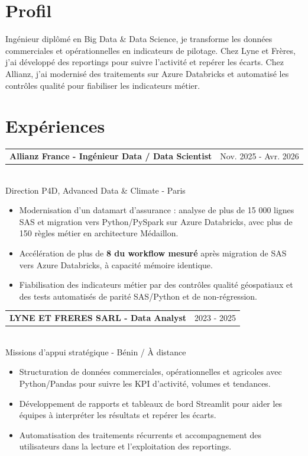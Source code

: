 \documentclass[10pt,a4paper]{article}
\makeatletter
\newcommand{\role}[3]{%
  \vspace{3pt}
  \begin{tabularx}{\linewidth}{@{}Xr@{}}
  \textbf{#1} & {\color{muted}#2}
  \end{tabularx}\vspace{0.8pt}\\
  {\color{muted}#3}\par
  \vspace{3pt}
}
\makeatother
\begin{document}
\begin{lrbox}{\maincolumnbox}
\begin{minipage}[t]{0.695\textwidth}
\vspace{0pt}
\raggedright

\section{Profil}
Ingénieur diplômé en Big Data \& Data Science, je transforme les données commerciales et opérationnelles en indicateurs de pilotage. Chez Lyne et Frères, j'ai développé des reportings pour suivre l'activité et repérer les écarts. Chez Allianz, j'ai modernisé des traitements sur Azure Databricks et automatisé les contrôles qualité pour fiabiliser les indicateurs métier.

\section{Expériences}
\role{Allianz France - Ingénieur Data / Data Scientist}{Nov. 2025 - Avr. 2026}{Direction P4D, Advanced Data \& Climate - Paris}
\begin{itemize}
  \item Modernisation d'un datamart d'assurance : analyse de plus de 15 000 lignes SAS et migration vers Python/PySpark sur Azure Databricks, avec plus de 150 règles métier en architecture Médaillon.
  \item Accélération de plus de \textbf{8\texttimes{} du workflow mesuré} après migration de SAS vers Azure Databricks, à capacité mémoire identique.
  \item Fiabilisation des indicateurs métier par des contrôles qualité géospatiaux et des tests automatisés de parité SAS/Python et de non-régression.
\end{itemize}

\vspace{8pt}
\role{LYNE ET FRERES SARL - Data Analyst}{2023 - 2025}{Missions d'appui stratégique - Bénin / À distance}
\begin{itemize}
  \item Structuration de données commerciales, opérationnelles et agricoles avec Python/Pandas pour suivre les KPI d'activité, volumes et tendances.
  \item Développement de rapports et tableaux de bord Streamlit pour aider les équipes à interpréter les résultats et repérer les écarts.
  \item Automatisation des traitements récurrents et accompagnement des utilisateurs dans la lecture et l'exploitation des reportings.
\end{itemize}


\end{minipage}
\end{lrbox}
\end{document}
